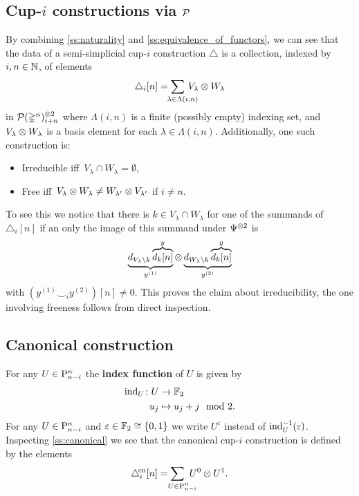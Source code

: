 \subsection{Cup-$i$ constructions via $\mathcal{P}$}\label{ss:axioms_revisited}

By combining \cref{ss:naturality} and \cref{ss:equivalence_of_functors}, we can see that the data of a semi-simplicial \mbox{cup-$i$} construction $\triangle$ is a collection, indexed by $i,n \in \mathbb{N}$, of elements
\begin{equation*}\label{eq:cup-i_dually}
	\triangle_i [n] =
	\sum_{\mathclap{\quad \lambda \in \Lambda(i,n)}} \, V_\lambda \ot W_\lambda
\end{equation*}
in $\mathcal{P}(\mathbb{\Delta}^n)^{\otimes 2}_{i+n}$
where $\Lambda(i,n)$ is a finite (possibly empty) indexing set, and $V_\lambda \otimes W_\lambda$ is a basis element for each $\lambda \in \Lambda(i,n)$.
Additionally, one such construction is:
\begin{itemize}
	\item Irreducible iff\,
	$V_\lambda \cap W_\lambda = \emptyset$,
	\item Free iff\,
	$V_{\lambda} \otimes W_{\lambda} \neq W_{\lambda'} \otimes V_{\lambda'}$ if $i \neq n$.
\end{itemize}
To see this we notice that there is $k \in V_\lambda \cap W_\lambda$ for one of the summands of $\triangle_i [n]$ if an only the image of this summand under $\Psi^{\otimes 2}$ is
\[
\underbrace{d_{V_\lambda \setminus k} \overbrace{d_k[n]}^{y}}_{y^{(1)}}
\otimes
\underbrace{d_{W_\lambda \setminus k} \overbrace{d_k[n]}^{y}}_{y^{(2)}}
\]
with $(y^{(1)} \smallsmile_i y^{(2)})[n] \neq 0$.
This proves the claim about irreducibility, the one involving freeness follows from direct inspection.

\subsection{Canonical construction}

For any $U \in \mathrm{P}^n_{n-i}$ the \textbf{index function} of $U$ is given by
\[
\begin{split}
	\operatorname{ind}_U \colon U &\to {\mathbb{F}_2} \\
	u_j &\mapsto u_j + j \mod 2.
\end{split}
\]
For any $U \in \mathrm{P}^n_{n-i}$ and $\varepsilon \in {\mathbb{F}_2} \cong \{0,1\}$ we write $U^\varepsilon$ instead of $\operatorname{ind}_U^{-1}(\varepsilon)$.
Inspecting \cref{ss:canonical} we see that the canonical \mbox{cup-$i$} construction is defined by the elements
\[
\canonical_i[n] =
\sum_{\mathclap{\quad U \in \rP^n_{n-i}}} \ U^0 \ot U^1.
\]

